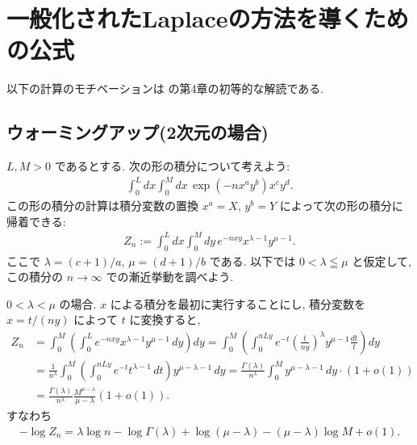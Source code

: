 \documentclass[12pt,twoside]{jarticle}
\theoremstyle{jplain}
\theoremstyle{jplain}
\theoremstyle{jplain}
\numberwithin{theorem}{section}
\numberwithin{equation}{section}
\numberwithin{figure}{section}
\numberwithin{table}{section}
\begin{document}

\section{一般化されたLaplaceの方法を導くための公式}

以下の計算のモチベーションは \cite{watanabe-2012} の第4章の初等的な解読である.


\subsection{ウォーミングアップ(2次元の場合)}

$L,M>0$ であるとする.
次の形の積分について考えよう:
\begin{align*}
\int_0^L dx \int_0^M dx\, \exp\left(-n x^a y^b \right) x^c y^d.
\end{align*}
この形の積分の計算は積分変数の置換 $x^a=X$, $y^b=Y$ によって次の形の積分に帰着できる:
\begin{align*}
Z_n:=\int_0^L dx \int_0^M dy\, e^{-nxy} x^{\lambda-1} y^{\mu-1}.
\end{align*}
ここで $\lambda=(c+1)/a$, $\mu=(d+1)/b$ である.
以下では $0<\lambda\leqq\mu$ と仮定して, この積分の $n\to\infty$ での漸近挙動を調べよう.

$0<\lambda<\mu$ の場合.  $x$ による積分を最初に実行することにし, 
積分変数を $x=t/(ny)$ によって $t$ に変換すると,  
\begin{align*}
Z_n
&= \int_0^M \left(\int_0^L e^{-nxy} x^{\lambda-1}y^{\mu-1}\,dy\right)dy
=\int_0^M \left(\int_0^{nLy} e^{-t} \left(\frac{t}{ny}\right)^\lambda y^{\mu-1}\frac{dt}{t}\right)dy
\\ &
=\frac{1}{n^\lambda}\int_0^M \left(\int_0^{nLy} e^{-t} t^{\lambda-1}\,dt\right)y^{\mu-\lambda-1}\,dy
=\frac{\Gamma(\lambda)}{n^\lambda}\int_0^M y^{\mu-\lambda-1}\,dy\cdot(1+o(1))
\\ &
=\frac{\Gamma(\lambda)}{n^\lambda}\frac{M^{\mu-\lambda}}{\mu-\lambda}(1+o(1)).
\end{align*}
すなわち
\begin{align*}
-\log Z_n = \lambda\log n -\log\Gamma(\lambda)+ \log(\mu-\lambda)-(\mu-\lambda)\log M + o(1).
\end{align*}
\end{document}
